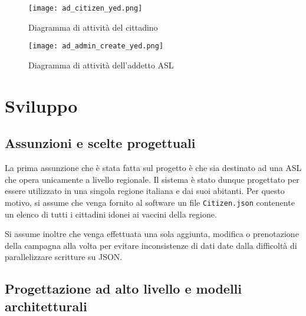 \documentclass{article}
\begin{document}
\begin{center}
    \begin{figure}
        \centering
        \caption{Diagramma di attività del cittadino}
        \texttt{[image: ad\_citizen\_yed.png]}
    \end{figure}
\end{center}

\begin{center}
    \begin{figure}
        \centering
        \caption{Diagramma di attività dell'addetto ASL}
        \texttt{[image: ad\_admin\_create\_yed.png]}
    \end{figure}
\end{center}


\section{Sviluppo}

\subsection{Assunzioni e scelte progettuali}

La prima assunzione che è stata fatta sul progetto è che sia destinato ad una ASL che opera unicamente a livello regionale. Il sistema è stato dunque progettato per essere utilizzato in una singola regione italiana e dai suoi abitanti. Per questo motivo, si assume che venga fornito al software un file \texttt{Citizen.json} contenente un elenco di tutti i cittadini idonei ai vaccini della regione.

Si assume inoltre che venga effettuata una sola aggiunta, modifica o prenotazione della campagna alla volta per evitare inconsistenze di dati date dalla difficoltà di parallelizzare scritture su JSON.

\subsection{Progettazione ad alto livello e modelli architetturali}
\end{document}
